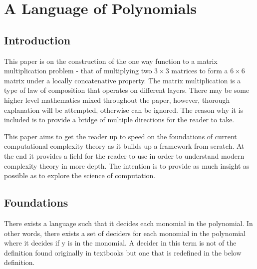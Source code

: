 
\chapter{A Language of Polynomials} %

\label{Chapter1} %


\newcommand{\keyword}[1]{\textbf{#1}}
\newcommand{\tabhead}[1]{\textbf{#1}}
\newcommand{\code}[1]{\texttt{#1}}
\newcommand{\file}[1]{\texttt{\bfseries#1}}
\newcommand{\option}[1]{\texttt{\itshape#1}}


\section{Introduction}

This paper is on the construction of the one way function to a matrix multiplication problem - that of multiplying two $3 \times 3$ matrices to form a $6 \times 6$ matrix under a locally concatenative property. The matrix multiplication is a type of law of composition that operates on different layers. There may be some higher level mathematics mixed throughout the paper, however, thorough explanation will be attempted, otherwise can be ignored. The reason why it is included is to provide a bridge of multiple directions for the reader to take.

This paper aims to get the reader up to speed on the foundations of current computational complexity theory as it builds up a framework from scratch. At the end it provides a field for the reader to use in order to understand modern complexity theory in more depth. The intention is to provide as much insight as possible as to explore the science of computation.


\section{Foundations}

There exists a language such that it decides each monomial in the polynomial. In other words, there exists a set of deciders for each monomial in the polynomial where it decides if y is in the monomial. A decider in this term is not of the definition found originally in textbooks but one that is redefined in the below definition.

